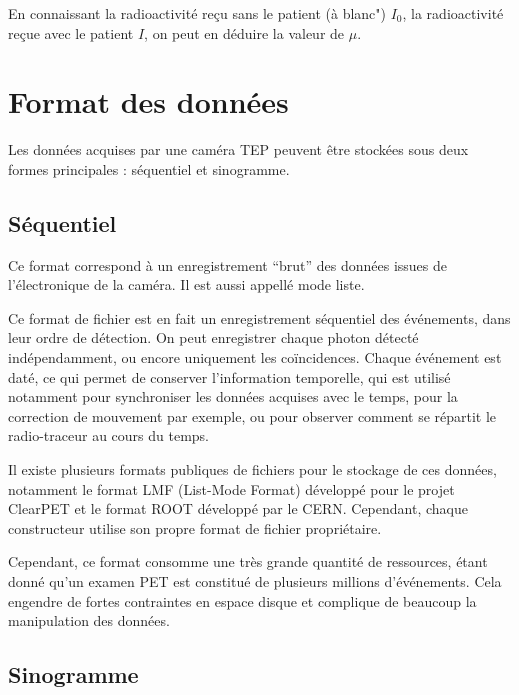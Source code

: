 En connaissant la radioactivité reçu sans le patient (à blanc") $I_0$, la radioactivité reçue avec le patient $I$, on peut en déduire la valeur de $\mu$.




	\section{Format des données}
Les données acquises par une caméra TEP peuvent être stockées sous deux formes principales : séquentiel et sinogramme.

		\subsection{Séquentiel}
\label{lab:modeliste}
Ce format correspond à un enregistrement ``brut'' des données issues de l'électronique de la caméra. Il est aussi appellé mode liste.

Ce format de fichier est en fait un enregistrement séquentiel des événements, dans leur ordre de détection. On peut enregistrer chaque photon détecté indépendamment, ou encore uniquement les coïncidences. Chaque événement est daté, ce qui permet de conserver l’information temporelle, qui est utilisé notamment pour synchroniser les données acquises avec le temps, pour la correction de mouvement par exemple, ou pour observer comment se répartit le radio-traceur au cours du temps.

Il existe plusieurs formats publiques de fichiers pour le stockage de ces données, notamment le format LMF (List-Mode Format) développé pour le projet ClearPET et le format ROOT développé par le CERN. Cependant, chaque constructeur utilise son propre format de fichier propriétaire.


Cependant, ce format consomme une très grande quantité de ressources, étant donné qu'un examen PET est constitué de plusieurs millions d'événements. Cela engendre de fortes contraintes en espace disque et complique de beaucoup la manipulation des données. 

		\subsection{Sinogramme}

